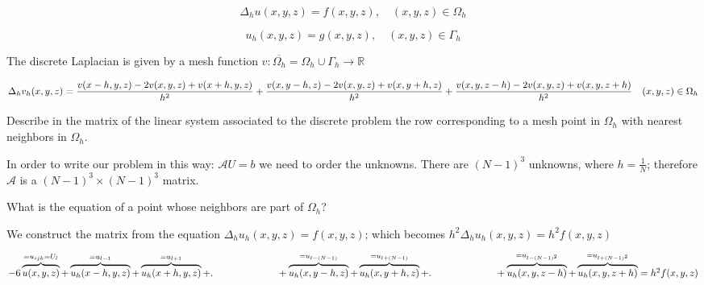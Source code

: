 \begin{equation*}
\Delta_h u(x, y, z) = f(x, y, z), \quad (x, y, z) \in \Omega_h
\end{equation*}

\begin{equation*}
u_h(x, y, z) = g(x, y, z), \quad (x, y, z) \in \Gamma_h
\end{equation*}

The discrete Laplacian is given by a mesh function $v: \overline{\Omega_h} = \Omega_h \cup \Gamma_h \rightarrow \mathbb{R}$

\begin{equation*}
\Delta_h v_h(x, y, z) = \frac{v(x-h, y, z) - 2v(x,y,z) + v(x+h, y, z)}{h^2} +\\
\frac{v(x, y-h, z) - 2v(x,y,z) + v(x, y+h, z)}{h^2} + \frac{v(x, y, z-h) - 2v(x,y,z) + v(x, y, z+h)}{h^2} \quad (x, y, z) \in \Omega_h
\end{equation*}

Describe in the matrix of the linear system associated to the discrete problem the row corresponding to a mesh point in $\Omega_h$ with nearest neighbors in $\Omega_h$.

In order to write our problem in this way: $\mathcal{A} U = b$ we need to order the unknowns.
There are $(N-1)^3$ unknowns, where $h = \frac{1}{N}$; therefore $\mathcal{A}$ is a $(N-1)^3 \times (N-1)^3$ matrix.

What is the equation of a point whose neighbors are part of $\Omega_h$?

We construct the matrix from the equation $\Delta_h u_h(x, y, z) = f(x, y, z)$; which becomes $h^2 \Delta_h u_h(x, y, z) = h^2 f(x, y, z)$

$
-6 \overbrace{u(x, y, z)}^{= u_{ijk} = U_l} + \overbrace{u_h(x-h, y, z)}^{= u_{l-1}} + \overbrace{u_h(x+h, y, z)}^{= u_{l+1}} +\\
.\qquad\qquad\qquad \; \; + \overbrace{u_h(x, y-h, z)}^{= u_{l-(N-1)}} + \overbrace{u_h(x, y+h, z)}^{= u_{l+(N-1)}} +\\
.\qquad\qquad\qquad \; \; + \overbrace{u_h(x, y, z-h)}^{= u_{l- (N-1)^2}} + \overbrace{u_h(x, y, z+h)}^{= u_{l+ (N-1)^2}} =
h^2 f(x, y, z)
$

\begin{equation*}
\end{equation*}

